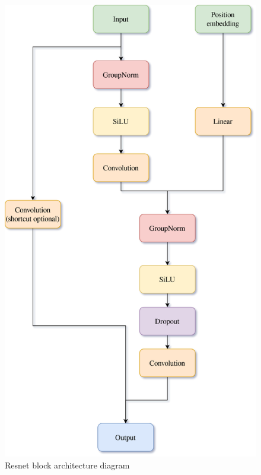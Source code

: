 \documentclass[11pt,a4paper]{report}
\begin{document}
\begin{figure}[H]
	\centering
	\includegraphics[scale=0.2]{images/ResnetBlock.drawio}
    \caption{Resnet block architecture diagram}
\end{figure}
\end{document}
